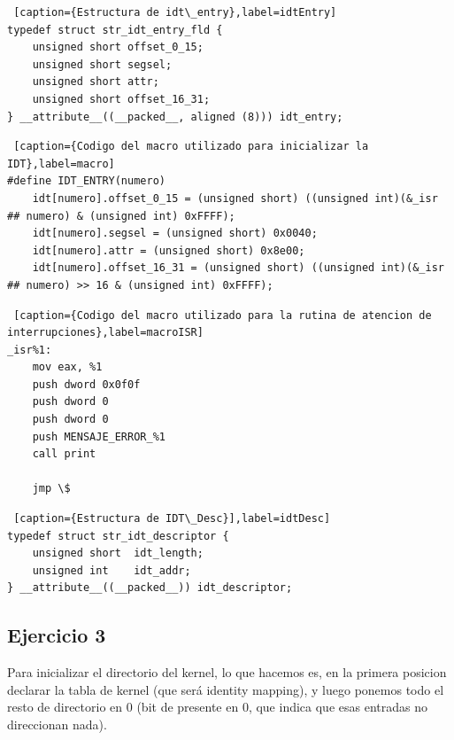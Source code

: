 \documentclass[a4paper]{article}
\begin{document}
\begin{lstlisting} [caption={Estructura de idt\_entry},label=idtEntry]
typedef struct str_idt_entry_fld {
    unsigned short offset_0_15;
    unsigned short segsel;
    unsigned short attr;
    unsigned short offset_16_31;
} __attribute__((__packed__, aligned (8))) idt_entry;

\end{lstlisting}


\begin{lstlisting} [caption={Codigo del macro utilizado para inicializar la IDT},label=macro]
#define IDT_ENTRY(numero)                                                                                        
    idt[numero].offset_0_15 = (unsigned short) ((unsigned int)(&_isr ## numero) & (unsigned int) 0xFFFF);        
    idt[numero].segsel = (unsigned short) 0x0040;                                                                
    idt[numero].attr = (unsigned short) 0x8e00;                                                                  
    idt[numero].offset_16_31 = (unsigned short) ((unsigned int)(&_isr ## numero) >> 16 & (unsigned int) 0xFFFF);
\end{lstlisting}

\begin{lstlisting} [caption={Codigo del macro utilizado para la rutina de atencion de interrupciones},label=macroISR]
_isr%1:
    mov eax, %1
    push dword 0x0f0f 
    push dword 0
    push dword 0
    push MENSAJE_ERROR_%1
    call print
    
    jmp \$
\end{lstlisting}

\begin{lstlisting} [caption={Estructura de IDT\_Desc}],label=idtDesc] 
typedef struct str_idt_descriptor {
    unsigned short  idt_length;
    unsigned int    idt_addr;
} __attribute__((__packed__)) idt_descriptor;
\end{lstlisting}

\subsection{Ejercicio 3}

\par Para inicializar el directorio del kernel, lo que hacemos es, en la primera posicion declarar la tabla de kernel (que será identity mapping), y luego ponemos todo el resto de directorio en 0 (bit de presente en 0, que indica que esas entradas no direccionan nada).
\end{document}
